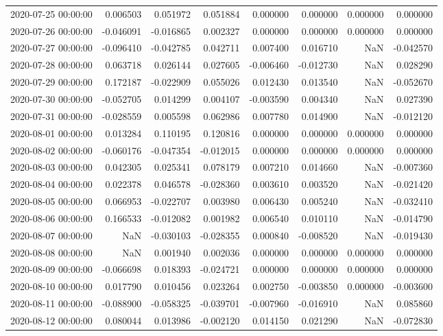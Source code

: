 \begin{tabular}{lrrrrrrr}
2020-07-25 00:00:00 & 0.006503 & 0.051972 & 0.051884 & 0.000000 & 0.000000 & 0.000000 & 0.000000 \\
2020-07-26 00:00:00 & -0.046091 & -0.016865 & 0.002327 & 0.000000 & 0.000000 & 0.000000 & 0.000000 \\
2020-07-27 00:00:00 & -0.096410 & -0.042785 & 0.042711 & 0.007400 & 0.016710 & NaN & -0.042570 \\
2020-07-28 00:00:00 & 0.063718 & 0.026144 & 0.027605 & -0.006460 & -0.012730 & NaN & 0.028290 \\
2020-07-29 00:00:00 & 0.172187 & -0.022909 & 0.055026 & 0.012430 & 0.013540 & NaN & -0.052670 \\
2020-07-30 00:00:00 & -0.052705 & 0.014299 & 0.004107 & -0.003590 & 0.004340 & NaN & 0.027390 \\
2020-07-31 00:00:00 & -0.028559 & 0.005598 & 0.062986 & 0.007780 & 0.014900 & NaN & -0.012120 \\
2020-08-01 00:00:00 & 0.013284 & 0.110195 & 0.120816 & 0.000000 & 0.000000 & 0.000000 & 0.000000 \\
2020-08-02 00:00:00 & -0.060176 & -0.047354 & -0.012015 & 0.000000 & 0.000000 & 0.000000 & 0.000000 \\
2020-08-03 00:00:00 & 0.042305 & 0.025341 & 0.078179 & 0.007210 & 0.014660 & NaN & -0.007360 \\
2020-08-04 00:00:00 & 0.022378 & 0.046578 & -0.028360 & 0.003610 & 0.003520 & NaN & -0.021420 \\
2020-08-05 00:00:00 & 0.066953 & -0.022707 & 0.003980 & 0.006430 & 0.005240 & NaN & -0.032410 \\
2020-08-06 00:00:00 & 0.166533 & -0.012082 & 0.001982 & 0.006540 & 0.010110 & NaN & -0.014790 \\
2020-08-07 00:00:00 & NaN & -0.030103 & -0.028355 & 0.000840 & -0.008520 & NaN & -0.019430 \\
2020-08-08 00:00:00 & NaN & 0.001940 & 0.002036 & 0.000000 & 0.000000 & 0.000000 & 0.000000 \\
2020-08-09 00:00:00 & -0.066698 & 0.018393 & -0.024721 & 0.000000 & 0.000000 & 0.000000 & 0.000000 \\
2020-08-10 00:00:00 & 0.017790 & 0.010456 & 0.023264 & 0.002750 & -0.003850 & 0.000000 & -0.003600 \\
2020-08-11 00:00:00 & -0.088900 & -0.058325 & -0.039701 & -0.007960 & -0.016910 & NaN & 0.085860 \\
2020-08-12 00:00:00 & 0.080044 & 0.013986 & -0.002120 & 0.014150 & 0.021290 & NaN & -0.072830 \\

\end{tabular}
